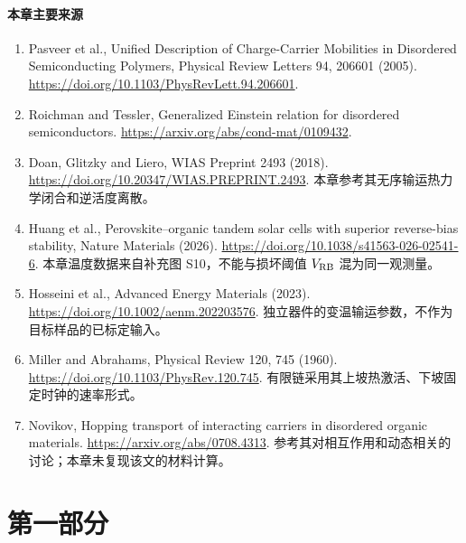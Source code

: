 \documentclass[11pt,a4paper]{article}
\begin{document}
\subsection{{\cjkfont 本章主要来源}\allowbreak{}}
\begin{enumerate}
\item Pasveer et al., Unified Description of Charge-Carrier Mobilities in Disordered Semiconducting Polymers, Physical Review Letters 94, 206601 (2005). \url{https://doi.org/10.1103/PhysRevLett.94.206601}.
\item Roichman and Tessler, Generalized Einstein relation for disordered semiconductors. \url{https://arxiv.org/abs/cond-mat/0109432}.
\item Doan, Glitzky and Liero, WIAS Preprint 2493 (2018). \url{https://doi.org/10.20347/WIAS.PREPRINT.2493}. {\cjkfont 本章参考其无序输运热力学闭合和逆活度离散。}\allowbreak{}
\item Huang et al., Perovskite--organic tandem solar cells with superior reverse-bias stability, Nature Materials (2026). \url{https://doi.org/10.1038/s41563-026-02541-6}. {\cjkfont 本章温度数据来自补充图}\allowbreak{} S10{\cjkfont ，不能与损坏阈值}\allowbreak{} $V_{\rm RB}$ {\cjkfont 混为同一观测量。}\allowbreak{}
\item Hosseini et al., Advanced Energy Materials (2023). \url{https://doi.org/10.1002/aenm.202203576}. {\cjkfont 独立器件的变温输运参数，不作为目标样品的已标定输入。}
\item Miller and Abrahams, Physical Review 120, 745 (1960). \url{https://doi.org/10.1103/PhysRev.120.745}. {\cjkfont 有限链采用其上坡热激活、下坡固定时钟的速率形式。}\allowbreak{}
\item Novikov, Hopping transport of interacting carriers in disordered organic materials. \url{https://arxiv.org/abs/0708.4313}. {\cjkfont 参考其对相互作用和动态相关的讨论；本章未复现该文的材料计算。}\allowbreak{}
\end{enumerate}
\FloatBarrier
\clearpage

\clearpage
\part*{{\cjkfont 第一部分}\allowbreak{} \allowbreak{}}
\FloatBarrier
\Needspace{110pt}
\end{document}
